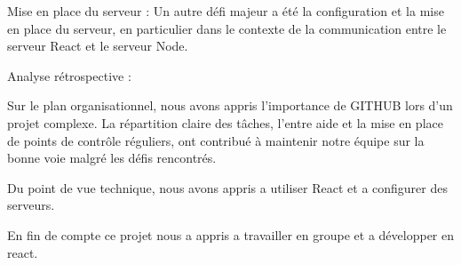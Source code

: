 \documentclass[a4paper]{article}
\begin{document}
Mise en place du serveur : Un autre défi majeur a été la configuration et la mise en place du serveur, en particulier dans le contexte de la communication entre le serveur React et le serveur Node.

Analyse rétrospective :

Sur le plan organisationnel, nous avons appris l'importance de GITHUB lors d'un projet complexe. La répartition claire des tâches, l'entre aide et la mise en place de points de contrôle réguliers, ont contribué à maintenir notre équipe sur la bonne voie malgré les défis rencontrés.

Du point de vue technique, nous avons appris a utiliser React et a configurer des serveurs.

En fin de compte ce projet nous a appris a travailler en groupe et a développer en react.
\end{document}
